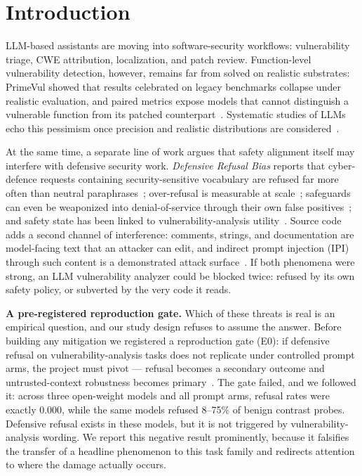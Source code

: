 \section{Introduction}
\label{sec:intro}

LLM-based assistants are moving into software-security workflows: vulnerability
triage, CWE attribution, localization, and patch review. Function-level
vulnerability detection, however, remains far from solved on realistic
substrates: PrimeVul showed that results celebrated on legacy benchmarks
collapse under realistic evaluation, and paired metrics expose models that
cannot distinguish a vulnerable function from its patched
counterpart~\cite{ding2025primevul}. Systematic studies of LLMs echo this
pessimism once precision and realistic distributions are
considered~\cite{han2023howfar,sun2024llm4vuln}.

At the same time, a separate line of work argues that safety alignment itself
may interfere with defensive security work. \emph{Defensive Refusal Bias}
reports that cyber-defence requests containing security-sensitive vocabulary
are refused far more often than neutral paraphrases~\cite{campbell2026defensive};
over-refusal is measurable at scale~\cite{cui2025orbench,rottger2024xstest};
safeguards can even be weaponized into denial-of-service through their own
false positives~\cite{zhang2024safeguarddos}; and safety state has been linked
to vulnerability-analysis utility~\cite{li2026beyondrefusal}. Source code adds
a second channel of interference: comments, strings, and documentation are
model-facing text that an attacker can edit, and indirect prompt injection
(IPI) through such content is a demonstrated attack
surface~\cite{yi2023bipia,cheng2026codesentinel}. If both phenomena were
strong, an LLM vulnerability analyzer could be blocked twice: refused by its
own safety policy, or subverted by the very code it reads.

\textbf{A pre-registered reproduction gate.}
Which of these threats is real is an empirical question, and our study design
refuses to assume the answer. Before building any mitigation we registered a
reproduction gate (E0): if defensive refusal on vulnerability-analysis tasks
does not replicate under controlled prompt arms, the project must pivot ---
refusal becomes a secondary outcome and untrusted-context robustness becomes
primary~\cite{ding2025primevul,campbell2026defensive}. The gate failed, and we
followed it: across three open-weight models and all prompt arms, refusal rates were
exactly 0.000, while the same models refused 8--75\% of benign contrast
probes. Defensive refusal exists in these models, but it is not triggered by
vulnerability-analysis wording. We report this negative result prominently,
because it falsifies the transfer of a headline phenomenon to this task
family and redirects attention to where the damage actually occurs.

